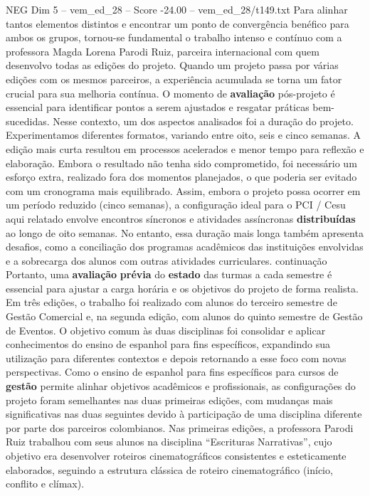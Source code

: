 \begin{textsample}{NEG Dim 5 – vem\_ed\_28 – Score -24.00 – vem\_ed\_28/t149.txt}
Para alinhar tantos elementos distintos e encontrar um ponto de convergência benéfico para ambos os grupos, tornou-se fundamental o trabalho intenso e contínuo com a professora Magda Lorena Parodi Ruiz, parceira internacional com quem desenvolvo todas as edições do projeto.
Quando um projeto passa por várias edições com os mesmos parceiros, a experiência acumulada se torna um fator crucial para sua melhoria contínua.
O momento de \textbf{avaliação} pós-projeto é essencial para identificar pontos a serem ajustados e resgatar práticas bem-sucedidas.
Nesse contexto, um dos aspectos analisados foi a duração do projeto.
Experimentamos diferentes formatos, variando entre oito, seis e cinco semanas.
A edição mais curta resultou em processos acelerados e menor tempo para reflexão e elaboração.
Embora o resultado não tenha sido comprometido, foi necessário um esforço extra, realizado fora dos momentos planejados, o que poderia ser evitado com um cronograma mais equilibrado.
Assim, embora o projeto possa ocorrer em um período reduzido (cinco semanas), a configuração ideal para o PCI / Cesu aqui relatado envolve encontros síncronos e atividades assíncronas \textbf{distribuídas} ao longo de oito semanas.
No entanto, essa duração mais longa também apresenta desafios, como a conciliação dos programas acadêmicos das instituições envolvidas e a sobrecarga dos alunos com outras atividades curriculares. continuação Portanto, uma \textbf{avaliação} \textbf{prévia} do \textbf{estado} das turmas a cada semestre é essencial para ajustar a carga horária e os objetivos do projeto de forma realista.
Em três edições, o trabalho foi realizado com alunos do terceiro semestre de Gestão Comercial e, na segunda edição, com alunos do quinto semestre de Gestão de Eventos.
O objetivo comum às duas disciplinas foi consolidar e aplicar conhecimentos do ensino de espanhol para fins específicos, expandindo sua utilização para diferentes contextos e depois retornando a esse foco com novas perspectivas.
Como o ensino de espanhol para fins específicos para cursos de \textbf{gestão} permite alinhar objetivos acadêmicos e profissionais, as configurações do projeto foram semelhantes nas duas primeiras edições, com mudanças mais significativas nas duas seguintes devido à participação de uma disciplina diferente por parte dos parceiros colombianos.
Nas primeiras edições, a professora Parodi Ruiz trabalhou com seus alunos na disciplina “Escrituras Narrativas”, cujo objetivo era desenvolver roteiros cinematográficos consistentes e esteticamente elaborados, seguindo a estrutura clássica de roteiro cinematográfico (início, conflito e clímax).

\end{textsample}
